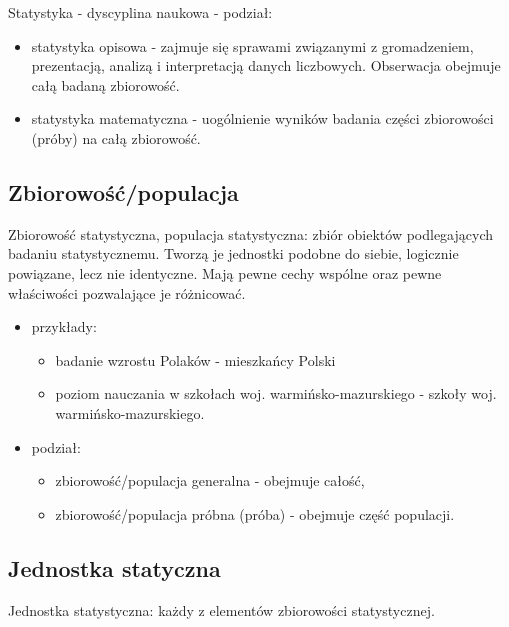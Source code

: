 \documentclass[
  polish,
  letterpaper,
  DIV=11,
  numbers=noendperiod]{scrreprt}
\providecommand{\tightlist}{%
  \setlength{\itemsep}{0pt}\setlength{\parskip}{0pt}}
\begin{document}
Statystyka - dyscyplina naukowa - podział:

\begin{itemize}
\tightlist
\item
  statystyka opisowa - zajmuje się sprawami związanymi z gromadzeniem,
  prezentacją, analizą i interpretacją danych liczbowych. Obserwacja
  obejmuje całą badaną zbiorowość.
\item
  statystyka matematyczna - uogólnienie wyników badania części
  zbiorowości (próby) na całą zbiorowość.
\end{itemize}

\subsection{Zbiorowość/populacja}\label{zbiorowoux15bux107populacja}

Zbiorowość statystyczna, populacja statystyczna: zbiór obiektów
podlegających badaniu statystycznemu. Tworzą je jednostki podobne do
siebie, logicznie powiązane, lecz nie identyczne. Mają pewne cechy
wspólne oraz pewne właściwości pozwalające je różnicować.

\begin{itemize}
\tightlist
\item
  przykłady:

  \begin{itemize}
  \tightlist
  \item
    badanie wzrostu Polaków - mieszkańcy Polski
  \item
    poziom nauczania w szkołach woj. warmińsko-mazurskiego - szkoły woj.
    warmińsko-mazurskiego.
  \end{itemize}
\item
  podział:

  \begin{itemize}
  \tightlist
  \item
    zbiorowość/populacja generalna - obejmuje całość,
  \item
    zbiorowość/populacja próbna (próba) - obejmuje część populacji.
  \end{itemize}
\end{itemize}

\subsection{Jednostka statyczna}\label{jednostka-statyczna}

Jednostka statystyczna: każdy z elementów zbiorowości statystycznej.
\end{document}
